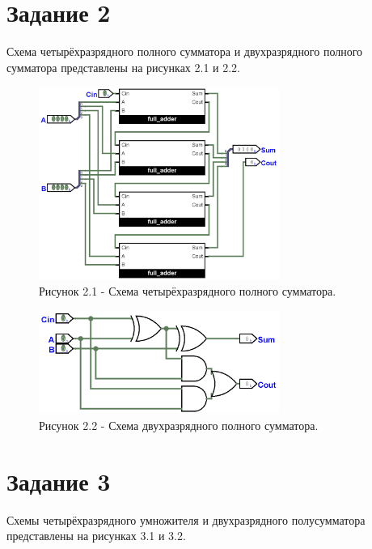 \documentclass[oneside,a4paper,14pt]{extarticle}
\begin{document}
\section*{Задание 2}
Схема четырёхразрядного полного сумматора и двухразрядного полного сумматора представлены на рисунках 2.1 и 2.2.\\

\begin{figure}[h!]
	\centering
	\includegraphics[width=0.7\textwidth]{pics/2.png}
	\caption*{Рисунок 2.1 - Схема четырёхразрядного полного сумматора.}
\end{figure}

\begin{figure}[h!]
	\centering
	\includegraphics[width=0.7\textwidth]{pics/2_fa.png}
	\caption*{Рисунок 2.2 - Схема двухразрядного полного сумматора.}
\end{figure}
\newpage

\section*{Задание 3}

Схемы четырёхразрядного умножителя и двухразрядного полусумматора представлены на рисунках 3.1 и 3.2.\\
\end{document}
